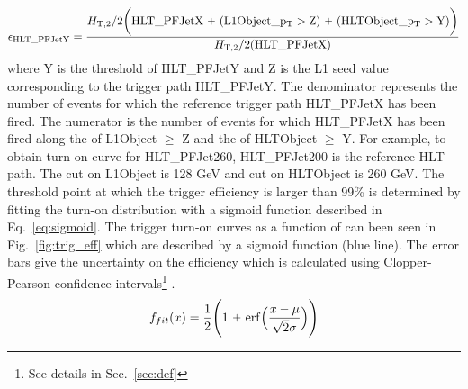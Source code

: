 \begin{equation}
 \label{eq:eff}
 {\rm \epsilon_{HLT\_PFJetY}} = \frac{\httwo {\rm \bigg(HLT\_PFJetX~\plus (L1Object\_\pt > Z)~\plus (HLTObject\_\pt > Y)\bigg)}}{\httwo {\rm (HLT\_PFJetX)}}
\end{equation}
where Y is the \pt threshold of HLT\_PFJetY and Z is the L1 seed value corresponding to the trigger path HLT\_PFJetY. The denominator represents the number of events for which the reference trigger path HLT\_PFJetX has been fired. The numerator is the number of events for which HLT\_PFJetX has been fired along the \pt of L1Object $\geq$ Z and the \pt of HLTObject $\geq$ Y. For example, to obtain turn-on curve for HLT\_PFJet260, HLT\_PFJet200 is the reference HLT path. The \pt cut on L1Object is 128 GeV and \pt cut on HLTObject is 260 GeV. The threshold point at which the trigger efficiency is larger than 99\% is determined by fitting the turn-on distribution with a sigmoid function described in Eq.~\ref{eq:sigmoid}. The trigger turn-on curves as a function of \httwo can been seen in Fig.~\ref{fig:trig_eff} which are described by a sigmoid function (blue line). The error bars give the uncertainty on the efficiency which is calculated using Clopper-Pearson confidence intervals\footnote{See details in Sec.~\ref{sec:def}} \cite{10.2307/2331986}.
\begin{equation}
 \label{eq:sigmoid}
 f_{fit} (x) = \frac {1}{2} \Bigg( 1 ~\plusn~ {\rm erf} \Big(\frac {x - \mu}{\sqrt{2} \sigma} \Big) \Bigg)
\end{equation}

